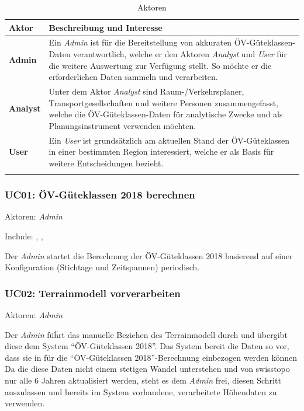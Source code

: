 \begin{longtable}{l p{14cm}}
        \toprule
        \textbf{Aktor}
                                & \textbf{Beschreibung und Interesse} \\
        \midrule
        \textbf{Admin}
                                & Ein \emph{Admin} ist für die Bereitstellung von akkuraten \acs{ÖV}-Güteklassen-Daten verantwortlich, welche er den Aktoren \emph{Analyst} und \emph{User} für die weitere Auswertung zur Verfügung stellt.
                                So möchte er die erforderlichen Daten sammeln und verarbeiten. \\
        \textbf{Analyst}
                                & Unter dem Aktor \emph{Analyst} sind Raum-/Verkehrsplaner, Transportgesellschaften und weitere Personen zusammengefasst, welche die \acs{ÖV}-Güteklassen-Daten für analytische Zwecke und als Planungsinstrument verwenden möchten. \\
        \textbf{User}
                                & Ein \emph{User} ist grundsätzlich am aktuellen Stand der \acs{ÖV}-Güteklassen in einer bestimmten Region interessiert, welche er als Basis für weitere Entscheidungen bezieht. \\
        \bottomrule
    \caption{Aktoren}
    \label{table:Aktoren}
\end{longtable}

\subsubsection{UC01: ÖV-Güteklassen 2018 berechnen}
\label{Use Cases:UC01}

Aktoren: \emph{Admin}

Include: , , 

Der \emph{Admin} startet die Berechnung der \acs{ÖV}-Güteklassen 2018 basierend auf einer Konfiguration (Stichtage und Zeitspannen) periodisch.


\subsubsection{UC02: Terrainmodell vorverarbeiten}
\label{Use Cases:UC02}

Aktoren: \emph{Admin}

Der \emph{Admin} füḧrt das manuelle Beziehen des \gls{Terrainmodell} durch und übergibt diese dem System "`\acs{ÖV}-Güteklassen 2018"'.
Das System bereit die Daten so vor, dass sie in  für die "`\acs{ÖV}-Güteklassen 2018"'-Berechnung einbezogen werden können
Da die diese Daten nicht einem stetigen Wandel unterstehen und von swisstopo~\cite{swissalti3d_swisstopo} nur alle 6 Jahren aktualisiert werden, steht es dem \emph{Admin} frei, diesen Schritt auszulassen und bereits im System vorhandene, verarbeitete Höhendaten zu verwenden.


